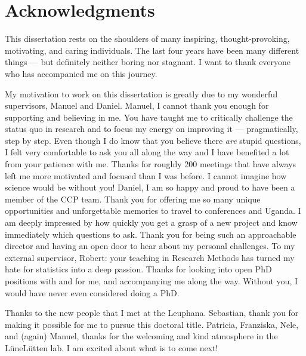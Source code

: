 \documentclass[
]{scrbook}
\begin{document}
\begin{titlepage}
\end{titlepage}

\tableofcontents

\chapter{Acknowledgments}\label{acknowledgments}

This dissertation rests on the shoulders of many inspiring, thought-provoking, motivating, and caring individuals. The last four years have been many different things --- but definitely neither boring nor stagnant. I want to thank everyone who has accompanied me on this journey.

My motivation to work on this dissertation is greatly due to my wonderful supervisors, Manuel and Daniel. Manuel, I cannot thank you enough for supporting and believing in me. You have taught me to critically challenge the status quo in research and to focus my energy on improving it --- pragmatically, step by step. Even though I do know that you believe there \emph{are} stupid questions, I felt very comfortable to ask you all along the way and I have benefited a lot from your patience with me. Thanks for roughly 200 meetings that have always left me more motivated and focused than I was before. I cannot imagine how science would be without you! Daniel, I am so happy and proud to have been a member of the CCP team. Thank you for offering me so many unique opportunities and unforgettable memories to travel to conferences and Uganda. I am deeply impressed by how quickly you get a grasp of a new project and know immediately which questions to ask. Thank you for being such an approachable director and having an open door to hear about my personal challenges. To my external supervisor, Robert: your teaching in Research Methods has turned my hate for statistics into a deep passion. Thanks for looking into open PhD positions with and for me, and accompanying me along the way. Without you, I would have never even considered doing a PhD.

Thanks to the new people that I met at the Leuphana. Sebastian, thank you for making it possible for me to pursue this doctoral title. Patricia, Franziska, Nele, and (again) Manuel, thanks for the welcoming and kind atmosphere in the LüneLütten lab. I am excited about what is to come next!
\end{document}
